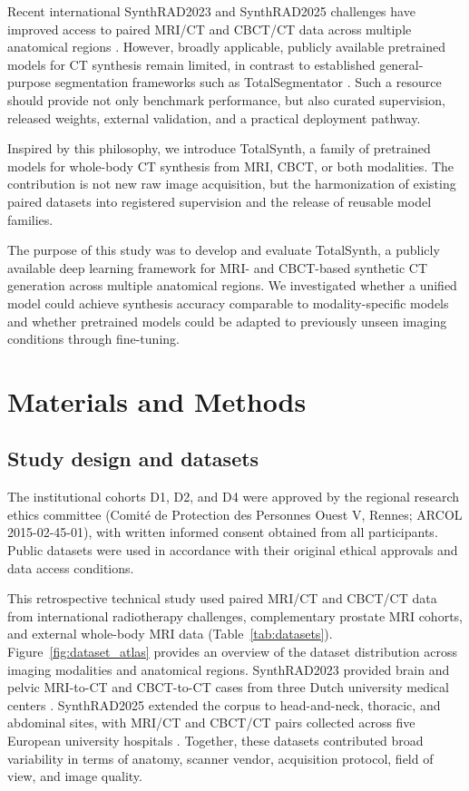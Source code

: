 \documentclass{article}
\begin{document}
Recent international SynthRAD2023 and SynthRAD2025 challenges have improved access to paired MRI/CT and CBCT/CT data across multiple anatomical regions \cite{huijben2024generating,thummerer2025synthrad2025}. 
However, broadly applicable, publicly available pretrained models for CT synthesis remain limited, in contrast to established general-purpose segmentation frameworks such as TotalSegmentator \cite{wasserthal2023totalsegmentator}. Such a resource should provide not only benchmark performance, but also curated supervision, released weights, external validation, and a practical deployment pathway.

Inspired by this philosophy, we introduce TotalSynth, a family of pretrained models for whole-body CT synthesis from MRI, CBCT, or both modalities. The contribution is not new raw image acquisition, but the harmonization of existing paired datasets into registered supervision and the release of reusable model families. 

The purpose of this study was to develop and evaluate TotalSynth, a publicly available deep learning framework for MRI- and CBCT-based synthetic CT generation across multiple anatomical regions. We investigated whether a unified model could achieve synthesis accuracy comparable to modality-specific models and whether pretrained models could be adapted to previously unseen imaging conditions through fine-tuning.

\section{Materials and Methods}

\subsection{Study design and datasets}

The institutional cohorts D1, D2, and D4 were approved by the regional research ethics committee (Comité de Protection des Personnes Ouest V, Rennes; ARCOL 2015-02-45-01), with written informed consent obtained from all participants. Public datasets were used in accordance with their original ethical approvals and data access conditions.

This retrospective technical study used paired MRI/CT and CBCT/CT data from international radiotherapy challenges, complementary prostate MRI cohorts, and external whole-body MRI data (Table~\ref{tab:datasets}). Figure~\ref{fig:dataset_atlas} provides an overview of the dataset distribution across imaging modalities and anatomical regions.
SynthRAD2023 provided brain and pelvic MRI-to-CT and CBCT-to-CT cases from three Dutch university medical centers \cite{thummerer2023synthrad2023,huijben2024generating}. SynthRAD2025 extended the corpus to head-and-neck, thoracic, and abdominal sites, with MRI/CT and CBCT/CT pairs collected across five European university hospitals \cite{thummerer2025synthrad2025,rogowski2026generating}. Together, these datasets contributed broad variability in terms of anatomy, scanner vendor, acquisition protocol, field of view, and image quality.
\end{document}
